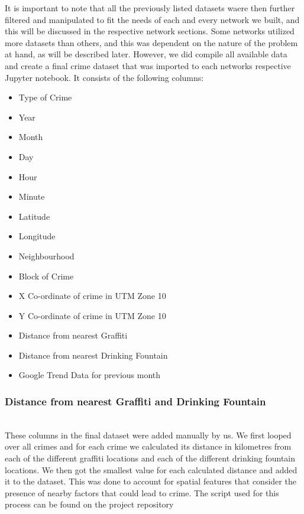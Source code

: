\documentclass[conference]{IEEEtran}
\begin{document}
It is important to note that all the previously listed datasets waere then further filtered and manipulated to fit
the needs of each and every network we built, and this will be discussed in the respective network sections.
Some networks utilized more datasets than others, and this was dependent on the nature of the problem at hand,
as will be described later. However, we did compile all available data and create a final crime dataset \cite{finalcrime} that was imported
to each networks respective Jupyter notebook. It consists of the following columns:\\

\begin{itemize}
  \item Type of Crime 
  \item Year
  \item Month
  \item Day
  \item Hour
  \item Minute
  \item Latitude
  \item Longitude
  \item Neighbourhood
  \item Block of Crime
  \item X Co-ordinate of crime in UTM Zone 10
  \item Y Co-ordinate of crime in UTM Zone 10
  \item Distance from nearest Graffiti
  \item Distance from nearest Drinking Fountain
  \item Google Trend Data for previous month\\
\end{itemize}

\subsubsection{Distance from nearest Graffiti and Drinking Fountain}

~\\These columns in the final dataset were added manually by us. We first looped over all crimes and for each crime we calculated its distance in kilometres
from each of the different graffiti locations and each of the different drinking fountain locations. We then got the smallest value for each calculated
distance and added it to the dataset. This was done to account for spatial features that consider the presence of nearby factors that could lead to crime.
The script used for this process can be found on the project repository \cite{Crime_Extractor} \cite{Drinking_Fountain_Extractor}
\end{document}
